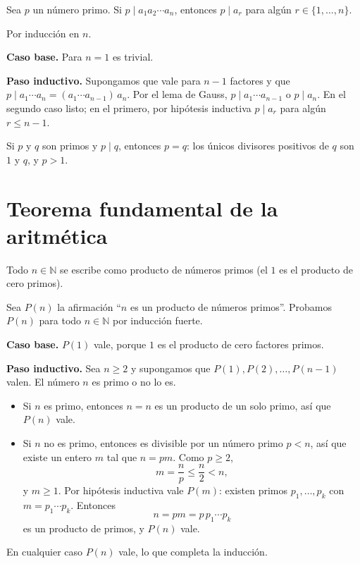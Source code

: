\begin{proposicion}[{title={Corolario}}]
Sea $p$ un número primo. Si $p\mid a_1a_2\cdots a_n$, entonces $p\mid a_r$ para
algún $r\in\{1,\dots,n\}$.
\end{proposicion}

\begin{demostracion}
Por inducción en $n$.

\textbf{Caso base.} Para $n=1$ es trivial.

\textbf{Paso inductivo.} Supongamos que vale para $n-1$ factores y que
$p\mid a_1\cdots a_n=(a_1\cdots a_{n-1})\,a_n$. Por el lema de Gauss,
$p\mid a_1\cdots a_{n-1}$ o $p\mid a_n$. En el segundo caso listo; en el primero,
por hipótesis inductiva $p\mid a_r$ para algún $r\le n-1$.
\end{demostracion}

\begin{nota}
Si $p$ y $q$ son primos y $p\mid q$, entonces $p=q$: los únicos divisores
positivos de $q$ son $1$ y $q$, y $p>1$.
\end{nota}

\section{Teorema fundamental de la aritmética}

\begin{proposicion}[{title={Teorema fundamental de la aritmética: existencia}}]
Todo $n\in\mathbb{N}$ se escribe como producto de números primos (el $1$ es el
producto de cero primos).
\end{proposicion}

\begin{demostracion}
Sea $P(n)$ la afirmación ``$n$ es un producto de números primos''. Probamos
$P(n)$ para todo $n\in\mathbb{N}$ por inducción fuerte.

\textbf{Caso base.} $P(1)$ vale, porque $1$ es el producto de cero factores primos.

\textbf{Paso inductivo.} Sea $n\ge 2$ y supongamos que $P(1),P(2),\dots,P(n-1)$
valen. El número $n$ es primo o no lo es.

\begin{itemize}
    \item Si $n$ es primo, entonces $n=n$ es un producto de un solo primo, así
    que $P(n)$ vale.
    \item Si $n$ no es primo, entonces es divisible por un número primo
    $p<n$, así que existe un entero $m$ tal que $n=pm$. Como $p\ge 2$,
    \[
    m=\frac{n}{p}\le \frac{n}{2}<n,
    \]
    y $m\ge 1$. Por hipótesis inductiva vale $P(m)$: existen primos
    $p_1,\dots,p_k$ con $m=p_1\cdots p_k$. Entonces
    \[
    n=pm=p\,p_1\cdots p_k
    \]
    es un producto de primos, y $P(n)$ vale.
\end{itemize}

En cualquier caso $P(n)$ vale, lo que completa la inducción.
\end{demostracion}

